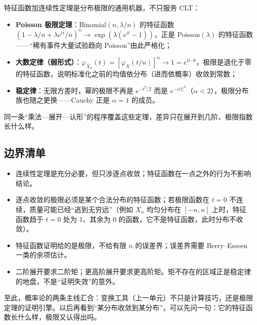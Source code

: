 特征函数加连续性定理是分布极限的通用机器，不只服务 CLT：

\begin{itemize}
\tightlist
\item
  \textbf{Poisson 极限定理}：Binomial\((n,\lambda/n)\) 的特征函数 \((1-\lambda/n+\lambda e^{it}/n)^n\to\exp(\lambda(e^{it}-1))\)，正是 Poisson\((\lambda)\) 的特征函数——``稀有事件大量试验趋向 Poisson''由此严格化；
\item
  \textbf{大数定律（弱形式）}：\(\varphi_{\bar X_n}(t)=[\varphi_X(t/n)]^n\to1=e^{it\cdot0}\)，极限是退化于零的特征函数，说明标准化之前的均值依分布（进而依概率）收敛到常数；
\item
  \textbf{稳定律}：无限方差时，幂的极限不再是 \(e^{-t^2/2}\) 而是 \(e^{-c|t|^\alpha}\)（\(\alpha<2\)），极限分布族也随之更换——Cauchy 正是 \(\alpha=1\) 的成员。
\end{itemize}

同一条``乘法—展开—认形''的程序覆盖这些定理，差异只在展开到几阶、极限指数长什么样。

\subsection{边界清单}

\begin{itemize}
\tightlist
\item
  连续性定理是充分必要，但只涉逐点收敛；特征函数在一点之外的行为不影响结论。
\item
  逐点收敛的极限必须是某个合法分布的特征函数；若极限函数在 \(t=0\) 不连续，质量可能已经``逃到无穷远''（例如 \(X_n\) 均匀分布在 \([-n,n]\) 上时，特征函数趋于 \(t=0\) 处为 1、其余为 0 的函数，它不是特征函数，此时分布不收敛）。
\item
  特征函数证明给的是极限，不给有限 \(n\) 的误差界；误差界需要 Berry--Esseen 一类的余项估计。
\item
  二阶展开要求二阶矩；更高阶展开要求更高阶矩。矩不存在的区域正是稳定律的地盘，不是``证明失效''的意外。
\end{itemize}

至此，概率论的两条主线汇合：变换工具（上一单元）不只是计算技巧，还是极限定理的证明引擎。以后再看到``某分布收敛到某分布''，可以先问一句：它的特征函数长什么样，极限又认得出吗。
